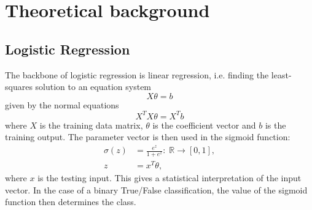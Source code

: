 \section{Theoretical background}

\subsection{Logistic Regression}
The backbone of logistic regression is linear regression, i.e. finding the least-squares solution to an equation system \begin{equation}
    X\theta = b
\end{equation}
given by the normal equations \begin{equation}
    X^TX \theta = X^Tb
\end{equation}
where $X$ is the training data matrix, $\theta$ is the coefficient vector and $b$ is the training output. The parameter vector is then used in the sigmoid function: \begin{align}
    \sigma(z) &= \frac{e^{z}}{1+e^{z}}: \; \mathbb{R}\to [0,1],\\
    z &= x^T \theta,
\end{align}
where $x$ is the testing input. This gives a statistical interpretation of the input vector. In the case of a binary True/False classification, the value of the sigmoid function then determines the class.